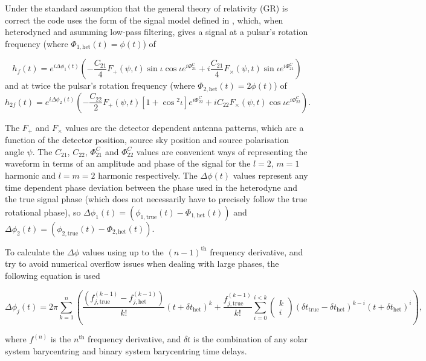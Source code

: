 Under the standard assumption that the general theory of relativity (GR) is correct the code uses the form of
the signal model defined in \citet{2015arXiv150105832J}, which, when heterodyned and asumming low-pass
filtering, gives a signal at a pulsar's rotation frequency (where $\Phi_{1,{\text{het}}}(t) = \phi(t)$) of
\begin{widetext}
\begin{equation}\label{eq:hf}
h_f(t) =  e^{i\Delta\phi_1(t)}\left(-\frac{C_{21}}{4}F_{+}(\psi,t)\sin{\iota}\cos{\iota}e^{i\Phi_{21}^C} +
i\frac{C_{21}}{4}F_{\times}(\psi,t)\sin{\iota}e^{i\Phi_{21}^C} \right)
\end{equation}
and at twice the pulsar's rotation frequency (where $\Phi_{2,{\text{het}}}(t) = 2\phi(t)$) of
\begin{equation}\label{eq:h2f}
h_{2f}(t) =  e^{i\Delta\phi_2(t)}\left(-\frac{C_{22}}{2}F_{+}(\psi,t)[1+\cos{}^2\iota]e^{i\Phi_{22}^C} +
iC_{22}F_{\times}(\psi,t)\cos{\iota}e^{i\Phi_{22}^C} \right).
\end{equation}
\end{widetext}
The $F_{+}$ and $F_{\times}$ values are the detector dependent antenna patterns, which are a function of the
detector position, source sky position and source polarisation angle $\psi$. The $C_{21}$, $C_{22}$,
$\Phi_{21}^C$ and $\Phi_{22}^C$ values are convenient ways of representing the waveform in terms of an
amplitude and phase of the signal for the $l=2$, $m=1$ harmonic and $l=m=2$ harmonic respectively. The
$\Delta\phi(t)$ values represent any time dependent phase deviation between the phase used in the heterodyne
and the true signal phase (which does not necessarily have to precisely follow the true rotational phase), so
$\Delta\phi_1(t) = (\phi_{1,{\text{true}}}(t)-\Phi_{1,{\text{het}}}(t))$ and $\Delta\phi_2(t) = (\phi_{2,{\text{true}}}(t)-\Phi_{2,{\text{het}}}(t))$.

To calculate the $\Delta\phi$ values using up to the $(n-1)^{\text{th}}$ frequency derivative, and try to avoid numerical overflow issues when dealing with large
phases, the following equation is used
\begin{widetext}
\begin{equation}\label{eq:deltaphi}
\Delta\phi_j(t) = 2\pi \sum_{k=1}^n \left( \frac{\left(f^{(k-1)}_{j,{\text{true}}} - f^{(k-1)}_{j,{\text{het}}}\right)}{k!}(t+\delta t_{\text{het}})^k + \frac{f^{(k-1)}_{j,{\text{true}}}}{k!} 
\sum_{i=0}^{i<k} \left(\begin{array}{c}k \\ i\end{array} \right) (\delta t_{\text{true}}-\delta t_{\text{het}})^{k-i} (t+\delta t_{\text{het}})^i \right),
\end{equation}
\end{widetext}
where $f^{(n)}$ is the $n^{\text{th}}$ frequency derivative, and $\delta t$ is the combination of any solar system barycentring and binary system
barycentring time delays.

